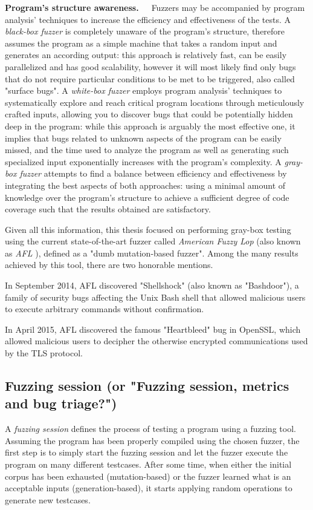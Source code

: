 \textbf{Program's structure awareness.}\ \ \  Fuzzers may be accompanied by program analysis' techniques to increase the efficiency and effectiveness of the tests. A \textit{black-box fuzzer} is completely unaware of the program's structure, therefore assumes the program as a simple machine that takes a random input and generates an according output: this approach is relatively fast, can be easily parallelized and has good scalability, however it will most likely find only bugs that do not require particular conditions to be met to be triggered, also called "surface bugs". A \textit{white-box fuzzer} employs program analysis' techniques to systematically explore and reach critical program locations through meticulously crafted inputs, allowing you to discover bugs that could be potentially hidden deep in the program: while this approach is arguably the most effective one, it implies that bugs related to unknown aspects of the program can be easily missed, and the time used to analyze the program as well as generating such specialized input exponentially increases with the program's complexity.
A \textit{gray-box fuzzer} attempts to find a balance between efficiency and effectiveness by integrating the best aspects of both approaches: using a minimal amount of knowledge over the program's structure to achieve a sufficient degree of code coverage such that the results obtained are satisfactory.

Given all this information, this thesis focused on performing gray-box testing using the current state-of-the-art fuzzer called \textit{American Fuzzy Lop} (also known as \textit{AFL} \cite{AFL}), defined as a "dumb mutation-based fuzzer". Among the many results achieved by this tool, there are two honorable mentions.

In September 2014, AFL discovered "Shellshock" \cite{shellshock} (also known as "Bashdoor"), a family of security bugs affecting the Unix Bash shell that allowed malicious users to execute arbitrary commands without confirmation.

In April 2015, AFL discovered the famous "Heartbleed" \cite{heartbleed} bug in OpenSSL, which allowed malicious users to decipher the otherwise encrypted communications used by the TLS protocol. 





\subsection{Fuzzing session (or "Fuzzing session, metrics and bug triage?")}
A \textit{fuzzing session} defines the process of testing a program using a fuzzing tool.
Assuming the program has been properly compiled using the chosen fuzzer, the first step is to simply start the fuzzing session and let the fuzzer execute the program on many different testcases. After some time, when either the initial corpus has been exhausted (mutation-based) or the fuzzer learned what is an acceptable inputs (generation-based), it starts applying random operations to generate new testcases. 

